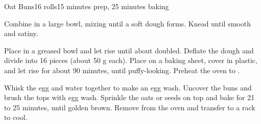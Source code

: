 \documentclass[../Cookbook.tex]{subfiles}
\begin{document}
\begin{recipe}[OatBuns]{Oat Buns}{16 rolls}{15 minutes prep, 25 minutes baking}
\renewcommand*{\thefootnote}{\num{footnote}}

Combine in a large bowl, mixing until a soft dough forms.
Knead until smooth and satiny.

Place in a greased bowl and let rise until about doubled.
Deflate the dough and divide into 16 pieces (about 50 g each).
Place on a baking sheet, cover in plastic, and let rise for about 90 minutes, until puffy-looking.
Preheat the oven to .

Whisk the egg and water together to make an egg wash.
Uncover the buns and brush the tops with egg wash.
Sprinkle the oats or seeds on top and bake for 21 to 25 minutes, until golden brown.
Remove from the oven and transfer to a rack to cool.
\end{recipe}
\end{document}
